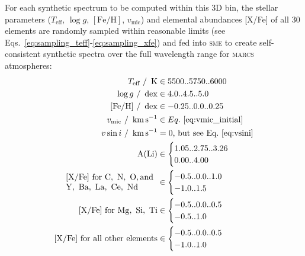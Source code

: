 \documentclass[
  journal=pasa,
  manuscript=research-paper, %
  year=2021,
  volume=37
]{cup-journal}
\newcommand{\SB}[1]{{\textcolor{purple}{#1}}}
\newcommand{\Teff}{$T_\mathrm{eff}$\xspace}
\newcommand{\logg}{$\log g$\xspace}
\newcommand{\feh}{$\mathrm{[Fe/H]}$\xspace}
\newcommand{\vmic}{$v_\mathrm{mic}$\xspace}
\newcommand{\sme}{\textsc{sme}\xspace}
\newcommand{\marcs}{\textsc{marcs}\xspace}
\newcommand{\dex}{\,\mathrm{dex}}	%
\newcommand{\K}{\,\mathrm{K}}	%
\newcommand{\kms}{\,\mathrm{km\,s^{-1}}}	%
\begin{document}
For each synthetic spectrum to be computed within this 3D bin, the stellar parameters (\Teff, \logg, \feh, \vmic) and elemental abundances [X/Fe] of all 30 elements are randomly sampled within reasonable limits (see Eqs.~\ref{eq:sampling_teff}-\ref{eq:sampling_xfe}) and fed into \sme to create self-consistent synthetic spectra over the full wavelength range for \marcs atmospheres:
\begin{align} 
    T_\text{eff}~/~\K &\in {5500..5750..6000} \\ \label{eq:sampling_teff}
    \log g~/~\dex &\in {4.0..4.5..5.0} \\
    \mathrm{[Fe/H]}~/~\dex &\in {-0.25..0.0..0.25} \\
    v_\text{mic}~/~\kms &\in Eq.~\ref{eq:vmic_initial} \\
    v \sin i~/~\kms &= 0\text{, but see Eq.~\ref{eq:vsini}} \\
    \mathrm{A(Li)} &\in \begin{cases} {1.05..2.75..3.26} \\ {0.00..4.00} \end{cases} \\
    \begin{array}{l}
    \mathrm{[X/Fe]~for~C,~N,~O, and}\\
    \mathrm{Y,~Ba,~La,~Ce,~Nd}
    \end{array}
    &\in \begin{cases} {-0.5..0.0..1.0} \\ {-1.0..1.5}  \end{cases} \\
    \mathrm{[X/Fe]~for~Mg,~Si,~Ti} &\in \begin{cases} {-0.5..0.0..0.5} \\ {-0.5..1.0}  \end{cases} \\
    \mathrm{[X/Fe]~for~all~other~elements} &\in \begin{cases} {-0.5..0.0..0.5} \\ {-1.0..1.0} \label{eq:sampling_xfe} \end{cases}
\end{align}

\end{document}
